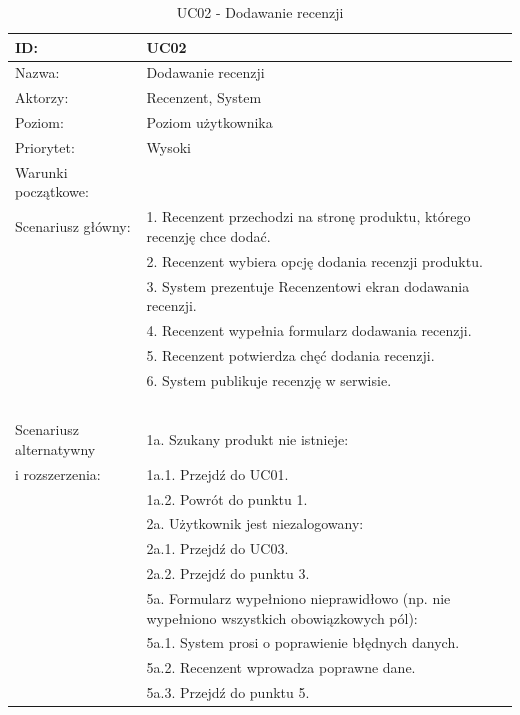 \begin{table}[H]
    \begin{tabular}{|p{5cm}|p{9cm}|}\hline
	ID: & UC02  \\\hline
    Nazwa: & Dodawanie recenzji \\\hline
    Aktorzy: & Recenzent, System \\\hline
    Poziom: & Poziom użytkownika  \\\hline
    Priorytet: & Wysoki \\\hline
    Warunki początkowe: & ~ \\\hline
    Scenariusz główny: & 1. Recenzent przechodzi na stronę produktu, którego recenzję chce dodać. \\
    ~ & 2. Recenzent wybiera opcję dodania recenzji produktu. \\
    ~ & 3. System prezentuje Recenzentowi ekran dodawania recenzji. \\
    ~ & 4. Recenzent wypełnia formularz dodawania recenzji. \\
    ~ & 5. Recenzent potwierdza chęć dodania recenzji. \\
    ~ & 6. System publikuje recenzję w serwisie. \\
    ~ & ~ \\\hline
    Scenariusz alternatywny & 1a. Szukany produkt nie istnieje: \\
    i rozszerzenia: & 1a.1. Przejdź do UC01. \\
    ~ & 1a.2. Powrót do punktu 1. \\
    ~ & 2a. Użytkownik jest niezalogowany: \\
    ~ & 2a.1. Przejdź do UC03. \\
    ~ & 2a.2. Przejdź do punktu 3. \\
    ~ & 5a. Formularz wypełniono nieprawidłowo (np. nie wypełniono wszystkich obowiązkowych pól): \\
    ~ & 5a.1. System prosi o poprawienie błędnych danych. \\
    ~ & 5a.2. Recenzent wprowadza poprawne dane. \\
    ~ & 5a.3. Przejdź do punktu 5. \\
    \hline\end{tabular}
	\caption{UC02 - Dodawanie recenzji}
\end{table}

